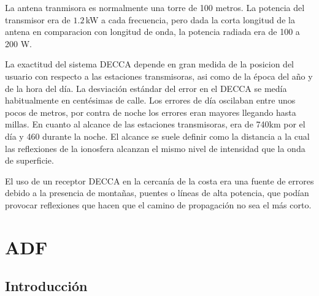 La antena tranmisora es normalmente una torre de 100 metros. La potencia del transmisor era de $1.2$\,kW a cada frecuencia, pero dada la corta longitud de la antena en comparacion con longitud de onda, la potencia radiada era de 100 a 200 W.

La exactitud del sistema DECCA depende en gran medida de la posicion del usuario con respecto a las estaciones transmisoras, asi como de la \'epoca del a\~no y de la hora del d\'ia. La desviaci\'on est\'andar del error en el DECCA se med\'ia habitualmente en cent\'esimas de calle. Los errores de d\'ia oscilaban entre unos pocos de metros, por contra de noche los errores eran mayores llegando hasta millas. En cuanto al alcance de las estaciones transmisoras, era de 740km por el d\'ia y 460 durante la noche. El alcance se suele definir como la distancia a la cual las reflexiones de la ionosfera alcanzan el mismo nivel de intensidad que la onda de superficie. 

El uso de un receptor DECCA en la cercan\'ia de la costa era una fuente de errores debido a la presencia de monta\~nas, puentes o l\'ineas de alta potencia, que pod\'ian provocar reflexiones que hacen que el camino de propagaci\'on no sea el m\'as corto.

\newpage

\section{ADF}

\subsection{Introducci\'on}
\label{sec:adf.introduccion}

